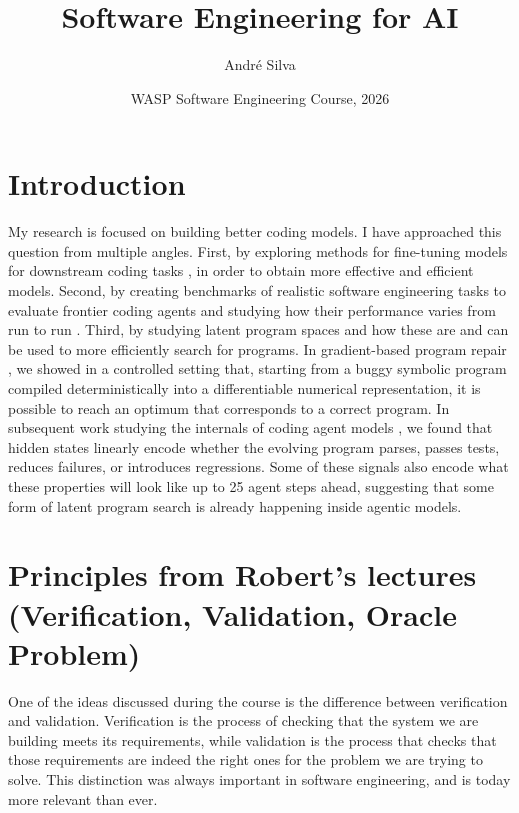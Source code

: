 \documentclass[11pt,a4paper]{article}
\title{Software Engineering for AI}
\author{Andr\'e Silva}
\date{WASP Software Engineering Course, 2026}
\begin{document}
\maketitle
\vspace{-1.5em}

\section{Introduction}

My research is focused on building better coding models. I have approached this question from multiple angles.
First, by exploring methods for fine-tuning models for downstream coding tasks \cite{silva2023mufin,silva2025repairllama}, in order to obtain more effective and efficient models.
Second, by creating benchmarks of realistic software engineering tasks to evaluate frontier coding agents \cite{saavedra2024gitbug,silva2024gitbug,silva2024repairbench} and studying how their performance varies from run to run \cite{bjarnason2026randomness}.
Third, by studying latent program spaces and how these are and can be used to more efficiently search for programs.
In gradient-based program repair \cite{silva2025gradient}, we showed in a controlled setting that, starting from a buggy symbolic program compiled deterministically into a differentiable numerical representation, it is possible to reach an optimum that corresponds to a correct program.
In subsequent work studying the internals of coding agent models \cite{silva2026latent}, we found that hidden states linearly encode whether the evolving program parses, passes tests, reduces failures, or introduces regressions. Some of these signals also encode what these properties will look like up to 25 agent steps ahead, suggesting that some form of latent program search is already happening inside agentic models.

\section{Principles from Robert's lectures (Verification, Validation, Oracle Problem)}

One of the ideas discussed during the course is the difference between verification and validation.
Verification is the process of checking that the system we are building meets its requirements, while validation is the process that checks that those requirements are indeed the right ones for the problem we are trying to solve.
This distinction was always important in software engineering, and is today more relevant than ever.
\end{document}
